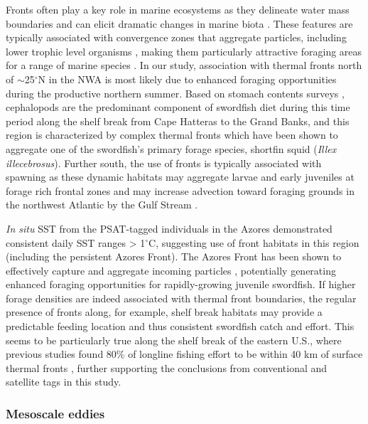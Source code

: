 Fronts often play a key role in marine ecosystems as they delineate water mass boundaries and can elicit dramatic changes in marine biota \citep{bakun2006fronts}. These features are typically associated with convergence zones that aggregate particles, including lower trophic level organisms \citep{Olson1985}, making them particularly attractive foraging areas for a range of marine species \citep{Bost2009, Polovina2000, Scales2015, Teo2007, Miller2015, Queiroz2016}. In our study, association with thermal fronts north of $\sim$25$^{\circ}$N in the NWA is most likely due to enhanced foraging opportunities during the productive northern summer. Based on stomach contents surveys \citep{Stillwell1985}, cephalopods are the predominant component of swordfish diet during this time period along the shelf break from Cape Hatteras to the Grand Banks, and this region is characterized by complex thermal fronts which have been shown to aggregate one of the swordfish's primary forage species, shortfin squid (\emph{Illex illecebrosus})\citep{Wilk1988}. Further south, the use of fronts is typically associated with spawning as these dynamic habitats may aggregate larvae and early juveniles at forage rich frontal zones \citep{Rooker2012, Suca2017} and may increase advection toward foraging grounds in the northwest Atlantic by the Gulf Stream \citep{Olson1994}.

\textit{In situ} SST from the PSAT-tagged individuals in the Azores demonstrated consistent daily SST ranges > 1$^\circ$C, suggesting use of front habitats in this region (including the persistent Azores Front). The Azores Front has been shown to effectively capture and aggregate incoming particles \citep{Sala2016}, potentially generating enhanced foraging opportunities \citep{Olson1985} for rapidly-growing juvenile swordfish. If higher forage densities are indeed associated with thermal front boundaries, the regular presence of fronts along, for example, shelf break habitats may provide a predictable feeding location and thus consistent swordfish catch and effort. This seems to be particularly true along the shelf break of the eastern U.S., where previous studies found 80\% of longline fishing effort to be within 40 km of surface thermal fronts \citep{Podesta1993}, further supporting the conclusions from conventional and satellite tags in this study.

\subsubsection{Mesoscale eddies}

